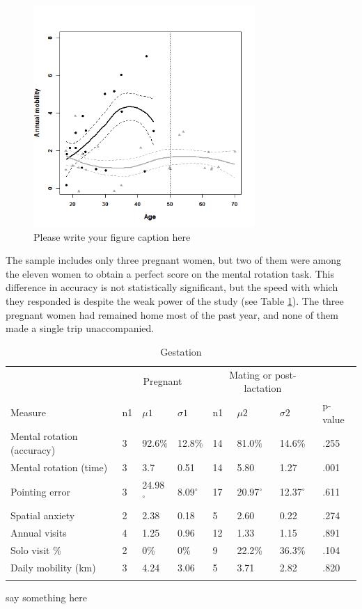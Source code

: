 \begin{figure}[!htb]
  \includegraphics[width=0.75\textwidth]{lactmob}
\caption{Please write your figure caption here}
\label{fig:lactmob}       %
\end{figure}

The sample includes only three pregnant women, but two of them were among the eleven women to obtain a perfect score on the mental rotation task.  This difference in accuracy is not statistically significant, but the speed with which they responded is despite the weak power of the study (see Table \ref{tab:preg}).  The three pregnant women had remained home most of the past year, and none of them made a single trip unaccompanied.

\begin{table}[h!]
\caption{Gestation}
\label{tab:preg}  
\begin{tabular}{llllllll}
\hline\noalign{\smallskip}
& \multicolumn{3}{c}{Pregnant} & \multicolumn{3}{c}{Mating or post-lactation} & \\
Measure & n1 & $\mu1$ & $\sigma1$ & n1 & $\mu2$ & $\sigma2$ & p-value \\
\noalign{\smallskip}\hline\noalign{\smallskip}
Mental rotation (accuracy) & 3 & 92.6\% & 12.8\% & 14 & 81.0\% & 14.6\% & .255 \\
Mental rotation (time) & 3 & 3.7 & 0.51 & 14 & 5.80 & 1.27 & .001 \\
Pointing error & 3 & 24.98$^{\circ}$ & 8.09$^{\circ}$ & 17 & 20.97$^{\circ}$ & 12.37$^{\circ}$ & .611 \\
Spatial anxiety & 2 & 2.38 & 0.18 & 5 & 2.60 & 0.22 & .274 \\
Annual visits & 4 & 1.25 & 0.96 & 12 & 1.33 & 1.15 & .891 \\
Solo visit \% & 2 & 0\% & 0\% & 9 & 22.2\% & 36.3\% & .104 \\
Daily mobility (km) & 3 & 4.24 & 3.06 & 5 & 3.71 & 2.82 & .820 \\
\noalign{\smallskip}\hline
\end{tabular}\par
\bigskip
say something here
\end{table}	

